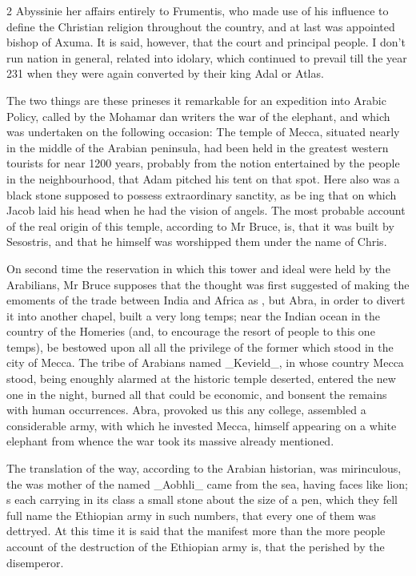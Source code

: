 \documentclass[10pt]{article}
\begin{document}
\begin{multicols}{2}\raggedcolumns
Abyssinie her affairs entirely to Frumentis, who made use of his influence to define the Christian religion throughout the country, and at last was appointed bishop of Axuma. It is said, however, that the court and principal people. I don’t run nation in general, related into idolary, which continued to prevail till the year 231 when they were again converted by their king Adal or Atlas.

The two things are these prineses it remarkable for an expedition into Arabic Policy, called by the Mohamar dan writers the war of the elephant, and which was undertaken on the following occasion: The temple of Mecca, situated nearly in the middle of the Arabian peninsula, had been held in the greatest western tourists for near 1200 years, probably from the notion entertained by the people in the neighbourhood, that Adam pitched his tent on that spot. Here also was a black stone supposed to possess extraordinary sanctity, as be ing that on which Jacob laid his head when he had the vision of angels. The most probable account of the real origin of this temple, according to Mr Bruce, is, that it was built by Sesostris, and that he himself was worshipped them under the name of Chris.

On second time the reservation in which this tower and ideal were held by the Arabilians, Mr Bruce supposes that the thought was first suggested of making the emoments of the trade between India and Africa as , but Abra, in order to divert it into another chapel, built a very long temps; near the Indian ocean in the country of the Homeries (and, to encourage the resort of people to this one temps), be bestowed upon all all the privilege of the former which stood in the city of Mecca. The tribe of Arabians named \_Kevield\_, in whose country Mecca stood, being enoughly alarmed at the historic temple deserted, entered the new one in the night, burned all that could be economic, and bonsent the remains with human occurrences. Abra, provoked us this any college, assembled a considerable army, with which he invested Mecca, himself appearing on a white elephant from whence the war took its massive already mentioned.

The translation of the way, according to the Arabian historian, was mirinculous, the was mother of the named \_Aobhli\_ came from the sea, having faces like lion; s each carrying in its class a small stone about the size of a pen, which they fell full name the Ethiopian army in such numbers, that every one of them was dettryed. At this time it is said that the manifest more than the more people account of the destruction of the Ethiopian army is, that the perished by the disemperor.


\end{multicols}
\end{document}
